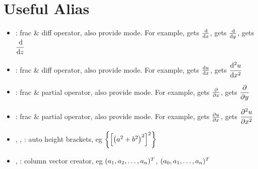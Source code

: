 \documentclass{article}
\begin{document}
\section{Useful Alias}
\begin{itemize}
\item {}: frac \& diff operator, also provide  mode. For example,  gets ${\frac{\operatorname{d\!}}{\operatorname{d\!} {x}}}$,  gets ${\frac{\operatorname{d\!}}{\operatorname{d\!} {y}}}$,  gets ${\dfrac{\operatorname{d\!}}{\operatorname{d\!} {z}}}$

\item {}: frac \& diff operator, also provide  mode. For example,  gets ${\frac{\operatorname{d\!} {u}}{\operatorname{d\!} {x}}}$,  gets ${\dfrac{\operatorname{d\!} {^2u}}{\operatorname{d\!} {x^2}}}$

\item {}: frac \& partial operator, also provide  mode. For example,  gets ${\frac{\partial}{\partial {x}}}$,  gets ${\dfrac{\partial}{\partial {y}}}$

\item {}: frac \& partial operator, also provide  mode. For example,  gets ${\frac{\partial {u}}{\partial {x}}}$,  gets ${\dfrac{\partial {^2u}}{\partial {x^2}}}$

\item {}, , : auto height brackets, eg ${\left\{ { {\left[ { {\left( {a^2 + b^2} \right)}^2 } \right]}^2 } \right\}}$

\item {}, : column vector creator, eg  ${ ({a}_1, {a}_2, \ldots, {a}_{n} )^T }$,  ${ ({a}_0, {a}_1, \ldots, {a}_{n} )^T }$
\end{itemize}

\end{document}
